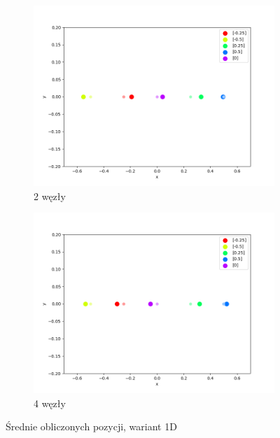 \begin{figure}[h]
\centering
\begin{subfigure}{.5\textwidth}
    \centering
    \includegraphics[width=\linewidth]{pics/mult_lat_1d/positions_2_mean.png}
\caption{2 węzły}
\label{pic:1d_2_mult}
\end{subfigure}%
\begin{subfigure}{.5\textwidth}
    \centering
    \includegraphics[width=\linewidth]{pics/mult_lat_1d/positions_4_mean.png}
    \caption{4 węzły}
\label{pic:1d_4_mult}
\end{subfigure}
\caption{Średnie obliczonych pozycji, wariant 1D}
\label{pic:1d_mult}
\end{figure}

